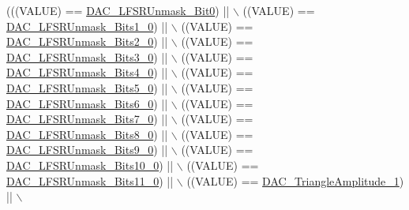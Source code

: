 \begin{DoxyCode}
(((VALUE) == \hyperlink{group___d_a_c__lfsrunmask__triangleamplitude_ga60794fd5092a332cfa82e1cee13945fc}{DAC\_LFSRUnmask\_Bit0}) || \(\backslash\)
                                                      ((VALUE) == 
      \hyperlink{group___d_a_c__lfsrunmask__triangleamplitude_ga09f47cfa563252a1add4662284350c07}{DAC\_LFSRUnmask\_Bits1\_0}) || \(\backslash\)
                                                      ((VALUE) == 
      \hyperlink{group___d_a_c__lfsrunmask__triangleamplitude_ga60b800857b7e33d9c0be2846fc56849f}{DAC\_LFSRUnmask\_Bits2\_0}) || \(\backslash\)
                                                      ((VALUE) == 
      \hyperlink{group___d_a_c__lfsrunmask__triangleamplitude_gafe219362b3a48d8678a65ef38cb45532}{DAC\_LFSRUnmask\_Bits3\_0}) || \(\backslash\)
                                                      ((VALUE) == 
      \hyperlink{group___d_a_c__lfsrunmask__triangleamplitude_ga2543d802e19d592a26c8231be663cdac}{DAC\_LFSRUnmask\_Bits4\_0}) || \(\backslash\)
                                                      ((VALUE) == 
      \hyperlink{group___d_a_c__lfsrunmask__triangleamplitude_ga71a01660d410823bfe76a603080dc125}{DAC\_LFSRUnmask\_Bits5\_0}) || \(\backslash\)
                                                      ((VALUE) == 
      \hyperlink{group___d_a_c__lfsrunmask__triangleamplitude_ga48fe2d3f4274d6bf28e446ca0001ed5d}{DAC\_LFSRUnmask\_Bits6\_0}) || \(\backslash\)
                                                      ((VALUE) == 
      \hyperlink{group___d_a_c__lfsrunmask__triangleamplitude_gaf0a93c1ee1e13776fae7558b36243431}{DAC\_LFSRUnmask\_Bits7\_0}) || \(\backslash\)
                                                      ((VALUE) == 
      \hyperlink{group___d_a_c__lfsrunmask__triangleamplitude_ga4f56965841d9d91ca5b6de43ee589598}{DAC\_LFSRUnmask\_Bits8\_0}) || \(\backslash\)
                                                      ((VALUE) == 
      \hyperlink{group___d_a_c__lfsrunmask__triangleamplitude_gaf7f4540d9ec6efe074e1e4485f9a347a}{DAC\_LFSRUnmask\_Bits9\_0}) || \(\backslash\)
                                                      ((VALUE) == 
      \hyperlink{group___d_a_c__lfsrunmask__triangleamplitude_ga7670f0e10f062571d0e56027ef653228}{DAC\_LFSRUnmask\_Bits10\_0}) || \(\backslash\)
                                                      ((VALUE) == 
      \hyperlink{group___d_a_c__lfsrunmask__triangleamplitude_gaeb9b5992b771f9a14587eeda58227831}{DAC\_LFSRUnmask\_Bits11\_0}) || \(\backslash\)
                                                      ((VALUE) == 
      \hyperlink{group___d_a_c__lfsrunmask__triangleamplitude_ga49b1eddf4e6371b4be8751162dc94ac4}{DAC\_TriangleAmplitude\_1}) || \(\backslash\)

\end{DoxyCode}
